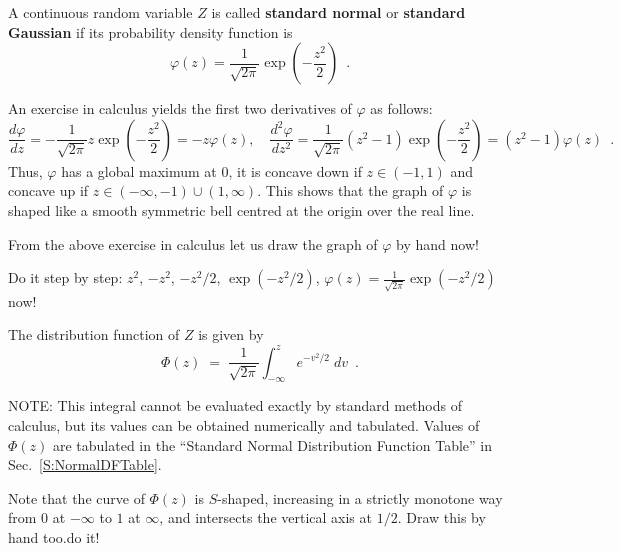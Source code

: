 \begin{framed}
\begin{model}\label{Df:StandardNormal} 
A continuous random variable $Z$ is called \textbf{standard normal} or {\bf standard Gaussian} 
if its probability density function is
\begin{equation}\label{E:StandardNormalPdf}
\varphi(z) = \frac{1}{\sqrt{2\pi}} \exp{\left( -\frac{z^2}{2}\right)} \enspace.
\end{equation}
\end{model}
\end{framed}

An exercise in calculus yields the first two derivatives of $\varphi$ as follows:
\[
\frac{d \varphi}{dz} = - \frac{1}{\sqrt{2\pi}}z \exp{\left( -\frac{z^2}{2}\right)}=-z\varphi(z), \quad
\frac{d^2 \varphi}{dz^2} = \frac{1}{\sqrt{2\pi}}(z^2-1) \exp{\left(-\frac{z^2}{2} \right)}=(z^2-1)\varphi(z) \enspace .
\]
Thus, $\varphi$ has a global maximum at $0$, it is concave down if $z \in (-1,1)$ and concave up if $z \in (-\infty,-1) \cup (1,\infty)$.  
This shows that the graph of $\varphi$ is shaped like a smooth symmetric bell centred at the origin over the real line.


\begin{classwork}
From the above exercise in calculus let us draw the graph of $\varphi$ by hand now!

Do it step by step: $z^2$, $-z^2$, $-z^2/2$, $\exp(-z^2/2)$, $\varphi(z) = \frac{1}{\sqrt{2\pi}} \exp(-z^2/2)$ now! 
\vspace*{20mm}
\end{classwork}

The distribution function of $Z$ is given by
\begin{equation}\label{E:StandardNormalDF}
\Phi(z) \;=\;\frac{1}{\sqrt{2\pi}}\int^z_{-\infty}e^{-v^2/2}\;dv \enspace .
\end{equation}

NOTE: {This integral cannot be evaluated exactly by standard methods of calculus, but its values can be
obtained numerically and tabulated.  Values of $\Phi(z)$ are tabulated in the ``Standard Normal Distribution Function Table'' in Sec.~\ref{S:NormalDFTable}.}

\begin{classwork}
{Note that the curve of $\Phi(z)$ is $S$-shaped, increasing in a strictly monotone way from $0$ at $-\infty$ to $1$ at $\infty$, and intersects the vertical axis at $1/2$. Draw this by hand too.}{}{do it! \vspace*{20mm}}
\end{classwork}

